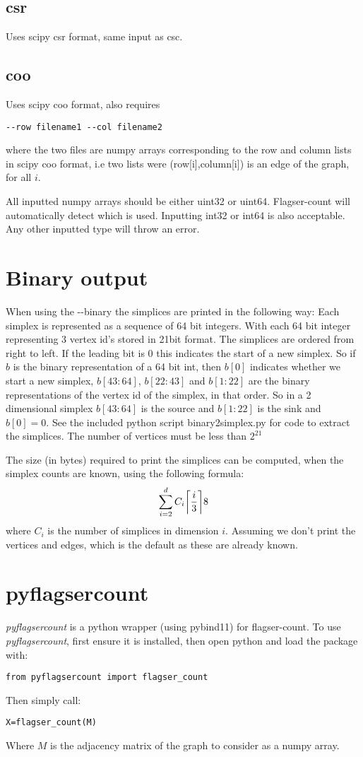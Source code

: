 \documentclass{amsart}
\theoremstyle{definition}
\let\originalleft\left
\let\originalright\right
\renewcommand{\left}{\mathopen{}\mathclose\bgroup\originalleft}
\renewcommand{\right}{\aftergroup\egroup\originalright}
\begin{document}
\subsection{csr}
Uses scipy csr format, same input as csc.

\subsection{coo}
Uses scipy coo format, also requires
\begin{verbatim}--row filename1 --col filename2\end{verbatim}
 where the two files are numpy arrays corresponding to the row and column lists in scipy coo format, i.e two lists were (row[i],column[i]) is an edge of the graph, for all $i$.

All inputted numpy arrays should be either uint32 or uint64. Flagser-count will automatically detect which is used. Inputting int32 or int64 is also acceptable. Any other inputted type will throw an error.
\section{Binary output}
When using the -{}-binary the simplices are printed in the following way: Each simplex is represented as a sequence of 64 bit integers. With each 64 bit integer representing 3 vertex id's stored in 21bit format. The simplices are ordered from right to left. If the leading bit is 0 this indicates the start of a new simplex. So if $b$ is the binary representation of a 64 bit int, then $b[0]$ indicates whether we start a new simplex, $b[43:64]$, $b[22:43]$ and $b[1:22]$ are the binary representations of the vertex id of the simplex, in that order. So in a 2 dimensional simplex $b[43:64]$ is the source and $b[1:22]$ is the sink and $b[0]=0$. See the included python script binary2simplex.py for code to extract the simplices. The number of vertices must be less than $2^{21}$

The size (in bytes) required to print the simplices can be computed, when the simplex counts are known, using the following formula:
$$ \sum_{i=2}^{d}C_i\left\lceil\frac{i}{3}\right\rceil8$$
where $C_i$ is the number of simplices in dimension $i$. Assuming we don't print the vertices and edges, which is the default as these are already known.

\section{pyflagsercount}
\textit{pyflagsercount} is a python wrapper (using pybind11) for flagser-count.
To use \textit{pyflagsercount}, first ensure it is installed, then open python and load the package with:
\begin{verbatim}from pyflagsercount import flagser_count\end{verbatim}
Then simply call:
\begin{verbatim}X=flagser_count(M)\end{verbatim}
Where $M$ is the adjacency matrix of the graph to consider as a numpy array.
\end{document}
